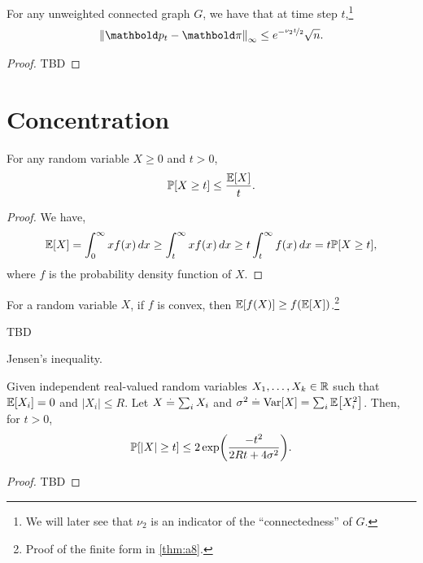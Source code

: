\begin{thm}
For any unweighted connected graph $G$, we have that at time step $t$,\footnote{We will later see that $\nu_2$ is an indicator of the ``connectedness'' of $G$.} \begin{align}
    \norm{\vp_t - \vpi}_\infty \leq e^{-\nicefrac{\nu_2 t}{2}}\sqrt{n}.
\end{align}
\end{thm}
\begin{proof}
TBD
\end{proof}

\section{Concentration}

\begin{thm}
For any random variable $X \geq 0$ and $t > 0$, \begin{align}
    \Pr{X \geq t} \leq \frac{\E{X}}{t}.
\end{align}
\end{thm}
\begin{proof} We have, \begin{align*}
    \E{X} = \int_0^\infty x f(x) \,dx \geq \int_t^\infty x f(x) \, dx \geq t \int_t^\infty f(x) \,dx = t \Pr{X \geq t},
\end{align*} where $f$ is the probability density function of $X$.
\end{proof}

\begin{thm}
For a random variable $X$, if $f$ is convex, then $\E{f(X)} \geq f(\E{X})$.\footnote{Proof of the finite form in \cref{thm:a8}.}
\end{thm}
\begin{marginfigure}
TBD
\caption{Jensen's inequality.}
\end{marginfigure}

\begin{thm} Given independent real-valued random variables $X_1, \dots, X_k \in \mathbb{R}$ such that $\E{X_i} = 0$ and $|X_i| \leq R$. Let $X \overset{.}{=} \sum_i X_i$ and $\sigma^2 \defeq \Var{X} = \sum_i \E{X_i^2}$. Then, for $t > 0$, \begin{align}
    \Pr{|X| \geq t} \leq 2 \exp\parentheses*{\frac{-t^2}{2Rt + 4\sigma^2}}.
\end{align}
\end{thm}
\begin{proof}
TBD
\end{proof}

